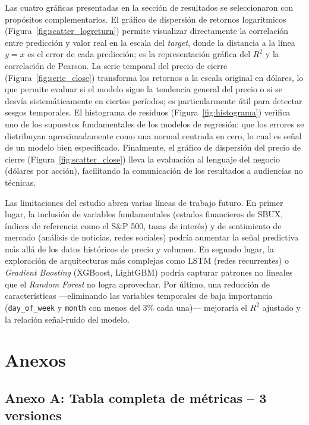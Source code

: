 \documentclass[12pt,a4paper]{article}
\begin{document}
Las cuatro gráficas presentadas en la sección de resultados se seleccionaron con propósitos complementarios. El gráfico de dispersión de retornos logarítmicos (Figura~\ref{fig:scatter_logreturn}) permite visualizar directamente la correlación entre predicción y valor real en la escala del \textit{target}, donde la distancia a la línea $y=x$ es el error de cada predicción; es la representación gráfica del $R^{2}$ y la correlación de Pearson. La serie temporal del precio de cierre (Figura~\ref{fig:serie_close}) transforma los retornos a la escala original en dólares, lo que permite evaluar si el modelo sigue la tendencia general del precio o si se desvía sistemáticamente en ciertos períodos; es particularmente útil para detectar sesgos temporales. El histograma de residuos (Figura~\ref{fig:histograma}) verifica uno de los supuestos fundamentales de los modelos de regresión: que los errores se distribuyan aproximadamente como una normal centrada en cero, lo cual es señal de un modelo bien especificado. Finalmente, el gráfico de dispersión del precio de cierre (Figura~\ref{fig:scatter_close}) lleva la evaluación al lenguaje del negocio (dólares por acción), facilitando la comunicación de los resultados a audiencias no técnicas.

Las limitaciones del estudio abren varias líneas de trabajo futuro. En primer lugar, la inclusión de variables fundamentales (estados financieros de SBUX, índices de referencia como el S\&P 500, tasas de interés) y de sentimiento de mercado (análisis de noticias, redes sociales) podría aumentar la señal predictiva más allá de los datos históricos de precio y volumen. En segundo lugar, la exploración de arquitecturas más complejas como LSTM (redes recurrentes) o \textit{Gradient Boosting} (XGBoost, LightGBM) podría capturar patrones no lineales que el \textit{Random Forest} no logra aprovechar. Por último, una reducción de características ---eliminando las variables temporales de baja importancia (\texttt{day\_of\_week} y \texttt{month} con menos del 3\% cada una)--- mejoraría el $R^{2}$ ajustado y la relación señal-ruido del modelo.

\newpage
\section{Anexos}
\label{sec:anexos}

\subsection{Anexo A: Tabla completa de métricas -- 3 versiones}
\end{document}
